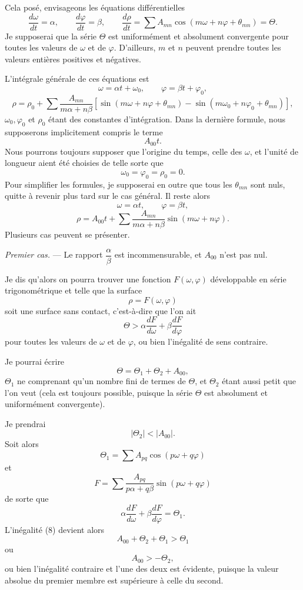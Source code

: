 \documentclass[11pt]{article}
\begin{document}
Cela posé, envisageons les équations différentielles
\[
\frac{d\omega}{dt}=\alpha,
\qquad
\frac{d\varphi}{dt}=\beta,
\qquad
\frac{d\rho}{dt}=\sum A_{mn}\cos(m\omega+n\varphi+\theta_{mn})=\Theta.
\]
Je supposerai que la série $\Theta$ est uniformément et absolument convergente pour toutes les valeurs de $\omega$ et de $\varphi$. D’ailleurs, $m$ et $n$ peuvent prendre toutes les valeurs entières positives et négatives.

L’intégrale générale de ces équations est
\[
\omega=\alpha t+\omega_0,
\qquad
\varphi=\beta t+\varphi_0,
\]
\[
\rho=\rho_0+\sum \frac{A_{mn}}{m\alpha+n\beta}\left[\sin(m\omega+n\varphi+\theta_{mn})-\sin(m\omega_0+n\varphi_0+\theta_{mn})\right],
\]
$\omega_0,\varphi_0$ et $\rho_0$ étant des constantes d’intégration. Dans la dernière formule, nous supposerons implicitement compris le terme
\[
A_{00}t.
\]
Nous pourrons toujours supposer que l’origine du temps, celle des $\omega$, et l’unité de longueur aient été choisies de telle sorte que
\[
\omega_0=\varphi_0=\rho_0=0.
\]
Pour simplifier les formules, je supposerai en outre que tous les $\theta_{mn}$ sont nuls, quitte à revenir plus tard sur le cas général. Il reste alors
\[
\omega=\alpha t,
\qquad
\varphi=\beta t,
\]
\[
\rho=A_{00}t+\sum \frac{A_{mn}}{m\alpha+n\beta}\sin(m\omega+n\varphi).
\]
Plusieurs cas peuvent se présenter.

\emph{Premier cas.} — Le rapport $\dfrac{\alpha}{\beta}$ est incommensurable, et $A_{00}$ n’est pas nul.

Je dis qu’alors on pourra trouver une fonction $F(\omega,\varphi)$ développable en série trigonométrique et telle que la surface
\[
\rho=F(\omega,\varphi)
\]
soit une surface sans contact, c’est-à-dire que l’on ait
\begin{equation}
\Theta>\alpha\frac{dF}{d\omega}+\beta\frac{dF}{d\varphi}
\tag{8}
\end{equation}
pour toutes les valeurs de $\omega$ et de $\varphi$, ou bien l’inégalité de sens contraire.

Je pourrai écrire
\[
\Theta=\Theta_1+\Theta_2+A_{00},
\]
$\Theta_1$ ne comprenant qu’un nombre fini de termes de $\Theta$, et $\Theta_2$ étant aussi petit que l’on veut (cela est toujours possible, puisque la série $\Theta$ est absolument et uniformément convergente).

Je prendrai
\[
|\Theta_2|<|A_{00}|.
\]
Soit alors
\[
\Theta_1=\sum A_{pq}\cos(p\omega+q\varphi)
\]
et
\[
F=\sum \frac{A_{pq}}{p\alpha+q\beta}\sin(p\omega+q\varphi)
\]
de sorte que
\[
\alpha\frac{dF}{d\omega}+\beta\frac{dF}{d\varphi}=\Theta_1.
\]
L’inégalité (8) devient alors
\[
A_{00}+\Theta_2+\Theta_1>\Theta_1
\]
ou
\[
A_{00}>-\Theta_2,
\]
ou bien l’inégalité contraire et l’une des deux est évidente, puisque la valeur absolue du premier membre est supérieure à celle du second.
\end{document}
